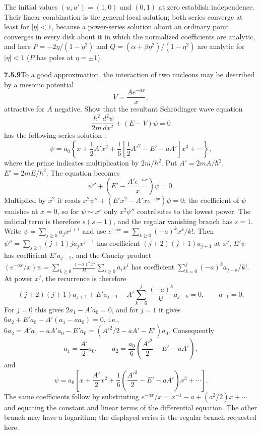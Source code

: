 The initial values $(u,u')=(1,0)$ and $(0,1)$ at zero establish
independence. Their linear combination is the general local solution;
both series converge at least for $|\eta|<1$, because a power-series
solution about an ordinary point converges in every disk about it in
which the normalized coefficients are analytic, and here
$P=-2\eta/(1-\eta^2)$ and $Q=(\alpha+\beta\eta^2)/(1-\eta^2)$ are
analytic for $|\eta|<1$ ($P$ has poles at $\eta=\pm1$).

\par\bigskip
\noindent\textbf{7.5.9}\quad To a good approximation, the interaction of two
nucleons may be described by a mesonic potential
\[
V=\frac{Ae^{-ax}}{x},
\]
attractive for $A$ negative. Show that the resultant Schr\"odinger wave
equation
\[
\frac{\hbar^{2}}{2m}\frac{d^{2}\psi}{dx^{2}}+(E-V)\psi=0
\]
has the following series solution :
\[
\psi=a_{0}\left\{x+\frac{1}{2}A'x^{2}
+\frac{1}{6}\left[\frac{1}{2}A'^{2}-E'-aA'\right]x^{3}+\cdots\right\},
\]
where the prime indicates multiplication by $2m/\hbar^{2}$.
\solution
Put $A'=2mA/\hbar^2$, $E'=2mE/\hbar^2$. The equation becomes
\[
\psi''+\left(E'-\frac{A'e^{-ax}}x\right)\psi=0.
\]
Multiplied by $x^2$ it reads $x^2\psi''+(E'x^2-A'xe^{-ax})\psi=0$; the
coefficient of $\psi$ vanishes at $x=0$, so for $\psi\sim x^s$ only
$x^2\psi''$ contributes to the lowest power. The indicial term is
therefore $s(s-1)$, and the regular
vanishing branch has $s=1$. Write
$\psi=\sum_{j\ge0}a_jx^{j+1}$ and use
$e^{-ax}=\sum_{k\ge0}(-a)^kx^k/k!$.
Then $\psi''=\sum_{j\ge1}(j+1)ja_jx^{j-1}$ has coefficient
$(j+2)(j+1)a_{j+1}$ at $x^j$, $E'\psi$ has coefficient $E'a_{j-1}$, and
the Cauchy product
$(e^{-ax}/x)\psi=\sum_{k\ge0}\frac{(-a)^kx^k}{k!}\sum_{i\ge0}a_ix^i$
has coefficient $\sum_{k=0}^j(-a)^ka_{j-k}/k!$.
At power $x^j$, the recurrence is therefore
\[
(j+2)(j+1)a_{j+1}+E'a_{j-1}
 -A'\sum_{k=0}^j\frac{(-a)^k}{k!}a_{j-k}=0,
\qquad a_{-1}=0.
\]
For $j=0$ this gives $2a_1-A'a_0=0$, and for $j=1$ it gives
$6a_2+E'a_0-A'(a_1-aa_0)=0$, i.e.,
$6a_2=A'a_1-aA'a_0-E'a_0=(A'^2/2-aA'-E')a_0$. Consequently
\[
a_1=\frac{A'}2a_0,\qquad
a_2=\frac{a_0}{6}\left(\frac{A'^2}{2}-E'-aA'\right),
\]
and
\[
\boxed{\psi=a_0\left[x+\frac{A'}2x^2
 +\frac16\left(\frac{A'^2}{2}-E'-aA'\right)x^3+\cdots\right]}.
\]
The same coefficients follow by substituting
$e^{-ax}/x=x^{-1}-a+(a^2/2)x+\cdots$ and equating the constant and
linear terms of the differential equation. The other branch may have a
logarithm; the displayed series is the regular branch requested here.

